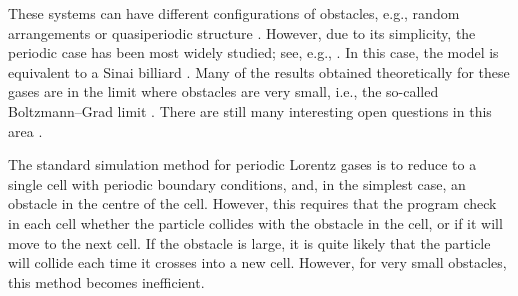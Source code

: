 \documentclass{iopart}
\begin{document}
These systems can have different configurations of obstacles, e.g., random arrangements \cite{latz1997lyapunov,dellago1997lyapunov, van1998chaotic} or quasiperiodic structure \cite{kraemer2013embedding,wennberg2012free}. However, due to its simplicity, the periodic case has been most widely studied; see, e.g., \cite{bunimovich1981statistical,bleher1992statistical, chernov1994statistical, gilbert2011diffusive}. In this case, the model is equivalent to a Sinai billiard  \cite{bunimovich1981statistical}. Many of the results obtained theoretically for these gases are in the limit where obstacles are very small, i.e., the so-called Boltzmann--Grad limit \cite{caglioti2003distribution, golse2012recent,boca2007distribution,golse2006periodic,caglioti2008boltzmann,caglioti2010boltzmann, golse2000distribution,marklof2008kinetic, bourgain1998distribution}. There are still many interesting open questions in this area
\cite{gilbert2009persistence,marklof2011periodic,nandori2014tail, dettmann2012new}.

The standard simulation method for periodic Lorentz gases is to reduce to a single cell with periodic boundary conditions, and, in the simplest case, an obstacle in the centre of the cell\cite{sanders2005fine, sanders2008normal}. However, this requires that the program check in each cell whether the particle collides with the obstacle in the cell, or if it will move to the next cell. 
If the obstacle is large, it is quite likely that the particle will collide each time it crosses into a new cell. However, for very small obstacles, this method becomes inefficient.
\end{document}

